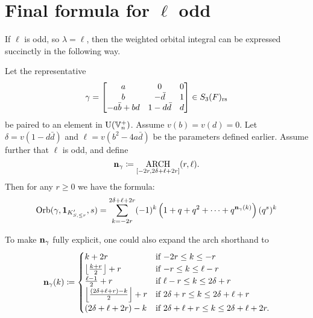 \section{Final formula for $\ell$ odd}
If $\ell$ is odd, so $\lambda = \ell$, then
the weighted orbital integral can be expressed succinctly in the following way.
\begin{theorem}
  Let the representative
  \[ \gamma = \begin{bmatrix}
      a & 0 & 0 \\
      b & - \bar d & 1 \\
      -a \bar b + b d & 1 - d \bar d & d
    \end{bmatrix} \in S_3(F)_{\mathrm{rs}} \]
  be paired to an element in $\operatorname{U}(\mathbb V_n^+)$.
  Assume $v(b) = v(d) = 0$.
  Let $\delta = v(1 - d \bar d)$
  and $\ell = v(b^2 - 4 a \bar d)$ be the parameters defined earlier.
  Assume further that $\ell$ is odd, and define
  \[ \mathbf n_\gamma \coloneqq \operatorname*{ARCH}_{[-2r, 2\delta + \ell + 2r]}(r, \ell). \]
  Then for any $r \ge 0$ we have the formula:
  \[
    \operatorname{Orb}(\gamma, \mathbf{1}_{K'_{S, \le r}}, s)
    = \sum_{k = -2r}^{2\delta + \ell + 2r}
    (-1)^k \left( 1 + q + q^2 + \dots + q^{\mathbf n_{\gamma}(k)}  \right) (q^s)^k
  \]
\end{theorem}
\begin{remark}
  To make $\mathbf n_\gamma$ fully explicit, one could also expand the arch shorthand to
  \[
    \mathbf n_\gamma(k)
    \coloneqq \begin{cases}
      k + 2r & \text{if } {-2r} \le k \le -r \\
      \left\lfloor \frac{k+r}{2} \right\rfloor + r & \text{if }{-r} \le k \le \ell-r \\
      \frac{\ell-1}{2} + r & \text{if } \ell - r \le k \le 2\delta + r \\
      \left\lfloor \frac{(2\delta+\ell+r)-k}{2} \right\rfloor + r & \text{if } 2\delta + r \le k \le 2\delta + \ell + r\\
      (2\delta + \ell + 2r) - k & \text{if } 2\delta + \ell + r \le k \le 2\delta + \ell + 2r.
    \end{cases} \]
\end{remark}

